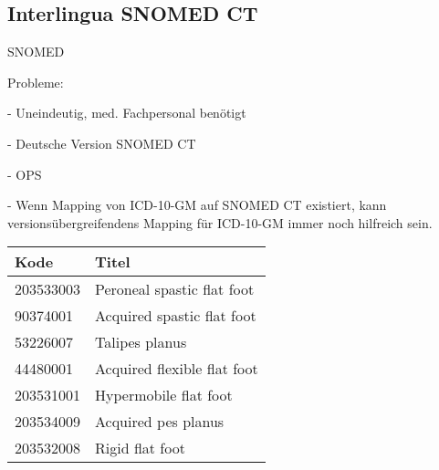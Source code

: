 \begin{comment}

--------------

UMLS

\bibitem{UMLS FHIR}
``An Interoperable UMLS Terminology Service Using FHIR'' \newline
\url{https://www.mdpi.com/1999-5903/12/11/199}

\bibitem{UMLS FHIR 2}
``Representing UMLS knowledge using FHIR Terminological Resources'' \newline
\url{https://ieeexplore.ieee.org/abstract/document/8983305}

--------------


\bibitem{MENDS-on-FHIR}
``MENDS-on-FHIR: Leveraging the OMOP common data model and FHIR standards for national chronic disease surveillance'' \newline
\url{https://www.medrxiv.org/content/10.1101/2023.08.09.23293900v2}


\end{comment}

\subsection{Interlingua SNOMED CT}

SNOMED \cite{icd10-to-snomed}

Probleme: 

- Uneindeutig, med. Fachpersonal benötigt

- Deutsche Version SNOMED CT

- OPS

- Wenn Mapping von ICD-10-GM auf SNOMED CT existiert, kann versionsübergreifendens Mapping für ICD-10-GM immer noch hilfreich sein. 



{
\renewcommand{\arraystretch}{1.2}
\begin{tabular}{ll}
Kode & Titel \\
\hline
203533003 & Peroneal spastic flat foot \\
90374001 & Acquired spastic flat foot \\
53226007 & Talipes planus \\
44480001 & Acquired flexible flat foot \\
203531001 & Hypermobile flat foot \\
203534009 & Acquired pes planus \\
203532008 & Rigid flat foot \\
\end{tabular}
}

